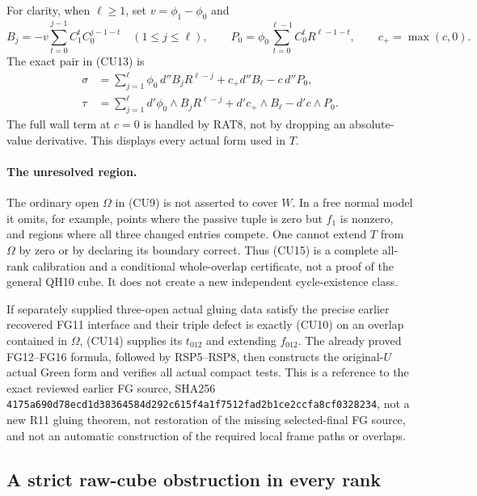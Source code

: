 For clarity, when $\ell\ge1$, set $v=\phi_1-\phi_0$ and
\[
 B_j=-v\sum_{t=0}^{j-1}C_1^tC_0^{j-1-t}\quad(1\le j\le\ell),
 \qquad P_0=\phi_0\sum_{t=0}^{\ell-1}C_0^tR^{\ell-1-t},
 \qquad c_+=\max(c,0).
 \tag{CU18}
\]
The exact pair in (CU13) is
\[
 \begin{split}
 \sigma&=\sum_{j=1}^{\ell}\phi_0\,d''B_j R^{\ell-j}
                       +c_+d''B_\ell-c\,d''P_0,\\
 \tau&=\sum_{j=1}^{\ell}d'\phi_0\wedge B_j R^{\ell-j}
                       +d'c_+\wedge B_\ell-d'c\wedge P_0.
 \end{split}
 \tag{CU19}
\]
The full wall term at $c=0$ is handled by RAT8, not by dropping
an absolute-value derivative.  This displays every actual form
used in $T$.

\paragraph{The unresolved region.}
The ordinary open $\Omega$ in (CU9) is not asserted to cover
$W$.  In a free normal model it omits, for example, points where
the passive tuple is zero but $f_1$ is nonzero, and regions where
all three changed entries compete.  One cannot extend $T$ from
$\Omega$ by zero or by declaring its boundary correct.  Thus
(CU15) is a complete all-rank calibration and a conditional
whole-overlap certificate, not a proof of the general QH10 cube.
It does not create a new independent cycle-existence class.

If separately supplied three-open actual gluing data satisfy
the precise earlier recovered FG11 interface and their triple
defect is exactly (CU10) on an overlap contained in $\Omega$,
(CU14) supplies its $t_{012}$ and extending $f_{012}$.  The
already proved FG12--FG16 formula, followed by RSP5--RSP8,
then constructs the original-$U$ actual Green form and verifies
all actual compact tests.  This is a reference to the exact
reviewed earlier FG source, SHA256
\texttt{4175a690d78ecd1d38364584d292c615f4a1f7512fad2b1ce2ccfa8cf0328234},
not a new R11 gluing theorem, not restoration of the missing
selected-final FG source, and not an automatic construction of
the required local frame paths or overlaps.

\subsection{A strict raw-cube obstruction in every rank}


